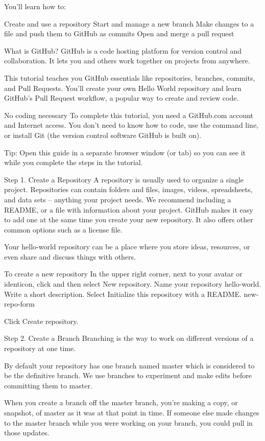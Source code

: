 You’ll learn how to:

Create and use a repository
Start and manage a new branch
Make changes to a file and push them to GitHub as commits
Open and merge a pull request

What is GitHub?
GitHub is a code hosting platform for version control and collaboration. It lets you and others work together on projects from anywhere.

This tutorial teaches you GitHub essentials like repositories, branches, commits, and Pull Requests. You’ll create your own Hello World repository and learn GitHub’s Pull Request workflow, a popular way to create and review code.

No coding necessary
To complete this tutorial, you need a GitHub.com account and Internet access. You don’t need to know how to code, use the command line, or install Git (the version control software GitHub is built on).

Tip: Open this guide in a separate browser window (or tab) so you can see it while you complete the steps in the tutorial.


Step 1. Create a Repository
A repository is usually used to organize a single project. Repositories can contain folders and files, images, videos, spreadsheets, and data sets – anything your project needs. We recommend including a README, or a file with information about your project. GitHub makes it easy to add one at the same time you create your new repository. It also offers other common options such as a license file.

Your hello-world repository can be a place where you store ideas, resources, or even share and discuss things with others.

To create a new repository
In the upper right corner, next to your avatar or identicon, click  and then select New repository.
Name your repository hello-world.
Write a short description.
Select Initialize this repository with a README.
new-repo-form

Click Create repository.


Step 2. Create a Branch
Branching is the way to work on different versions of a repository at one time.

By default your repository has one branch named master which is considered to be the definitive branch. We use branches to experiment and make edits before committing them to master.

When you create a branch off the master branch, you’re making a copy, or snapshot, of master as it was at that point in time. If someone else made changes to the master branch while you were working on your branch, you could pull in those updates.

